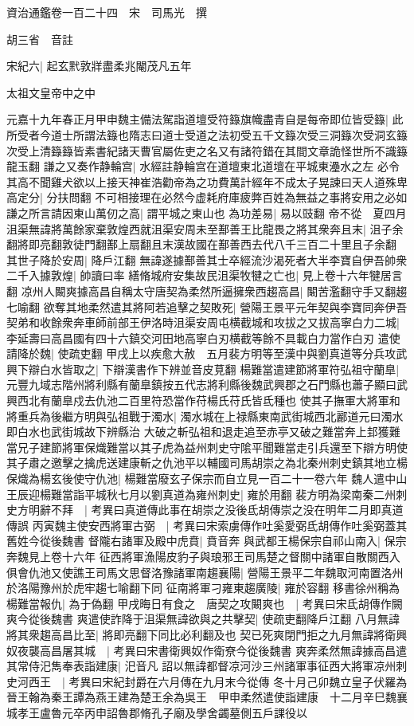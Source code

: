 資治通鑑卷一百二十四　宋　司馬光　撰

胡三省　音註

宋紀六|{
	起玄黓敦牂盡柔兆閹茂凡五年}


太祖文皇帝中之中

元嘉十九年春正月甲申魏主備法駕詣道壇受符籙旗幟盡青自是每帝即位皆受籙|{
	此所受者今道士所謂法籙也隋志曰道士受道之法初受五千文籙次受三洞籙次受洞玄籙次受上清籙籙皆素書紀諸天曹官屬佐吏之名又有諸符錯在其間文章詭怪世所不識籙龍玉翻}
謙之又奏作静輪宫|{
	水經註静輪宫在道壇東北道壇在平城東灅水之左}
必令其高不聞雞犬欲以上接天神崔浩勸帝為之功費萬計經年不成太子晃諫曰天人道殊卑高定分|{
	分扶問翻}
不可相接理在必然今虚耗府庫疲弊百姓為無益之事將安用之必如謙之所言請因東山萬仞之高|{
	謂平城之東山也}
為功差易|{
	易以豉翻}
帝不從　夏四月沮渠無諱將萬餘家棄敦煌西就沮渠安周未至鄯善王比龍畏之將其衆奔且末|{
	沮子余翻將即亮翻敦徒門翻鄯上扇翻且末漢故國在鄯善西去代八千三百二十里且子余翻}
其世子降於安周|{
	降戶江翻}
無諱遂據鄯善其士卒經流沙渴死者大半李寶自伊吾帥衆二千入據敦煌|{
	帥讀曰率}
繕脩城府安集故民沮渠牧犍之亡也|{
	見上卷十六年犍居言翻}
凉州人闞爽據高昌自稱太守唐契為柔然所逼擁衆西趨高昌|{
	闞苦濫翻守手又翻趨七喻翻}
欲奪其地柔然遣其將阿若追擊之契敗死|{
	營陽王景平元年契與李寶同奔伊吾}
契弟和收餘衆奔車師前部王伊洛時沮渠安周屯横截城和攻拔之又拔高寧白力二城|{
	李延壽曰高昌國有四十六鎮交河田地高寧白刃横截等餘不具載白力當作白刃}
遣使請降於魏|{
	使疏吏翻}
甲戌上以疾愈大赦　五月裴方明等至漢中與劉真道等分兵攻武興下辯白水皆取之|{
	下辯漢書作下辨並音皮莧翻}
楊難當遣建節將軍符弘祖守蘭臯|{
	元豐九域志階州將利縣有蘭臯鎮按五代志將利縣後魏武興郡之石門縣也蕭子顯曰武興西北有蘭臯戍去仇池二百里符恐當作苻楊氏苻氏皆氐種也}
使其子撫軍大將軍和將重兵為後繼方明與弘祖戰于濁水|{
	濁水城在上禄縣東南武街城西北酈道元曰濁水即白水也武街城故下辨縣治}
大破之斬弘祖和退走追至赤亭又破之難當奔上邽獲難當兄子建節將軍保熾難當以其子虎為益州刺史守隂平聞難當走引兵還至下辯方明使其子肅之邀擊之擒虎送建康斬之仇池平以輔國司馬胡崇之為北秦州刺史鎮其地立楊保熾為楊玄後使守仇池|{
	楊難當廢玄子保宗而自立見一百二十一卷六年}
魏人遣中山王辰迎楊難當詣平城秋七月以劉真道為雍州刺史|{
	雍於用翻}
裴方明為梁南秦二州刺史方明辭不拜　|{
	考異曰真道傳此事在胡崇之没後氐胡傳崇之没在明年二月即真道傳誤}
丙寅魏主使安西將軍古弼　|{
	考異曰宋索虜傳作吐奚愛弼氐胡傳作吐奚弼蓋其舊姓今從後魏書}
督隴右諸軍及殿中虎賁|{
	賁音奔}
與武都王楊保宗自祁山南入|{
	保宗奔魏見上卷十六年}
征西將軍漁陽皮豹子與琅邪王司馬楚之督關中諸軍自散關西入俱會仇池又使譙王司馬文思督洛豫諸軍南趨襄陽|{
	營陽王景平二年魏取河南置洛州於洛陽豫州於虎牢趨七喻翻下同}
征南將軍刁雍東趨廣陵|{
	雍於容翻}
移書徐州稱為楊難當報仇|{
	為于偽翻}
甲戌晦日有食之　唐契之攻闞爽也　|{
	考異曰宋氐胡傳作闕爽今從後魏書}
爽遣使詐降于沮渠無諱欲與之共擊契|{
	使疏吏翻降戶江翻}
八月無諱將其衆趨高昌比至|{
	將即亮翻下同比必利翻及也}
契已死爽閉門拒之九月無諱將衛興奴夜襲高昌屠其城　|{
	考異曰宋書衛興奴作衛尞今從後魏書}
爽奔柔然無諱據高昌遣其常侍汜雋奉表詣建康|{
	汜音凡}
詔以無諱都督凉河沙三州諸軍事征西大將軍凉州刺史河西王　|{
	考異曰宋紀封爵在六月傳在九月末今從傳}
冬十月己卯魏立皇子伏羅為晉王翰為秦王譚為燕王建為楚王余為吳王　甲申柔然遣使詣建康　十二月辛巳魏襄城孝王盧魯元卒丙申詔魯郡脩孔子廟及學舍蠲墓側五戶課役以

